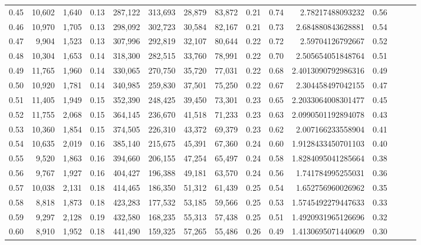 \begin{tabular}{rrrrrrrrrrrrrrr}
0.45 &  10,602 &  1,640 &  0.13 &  287,122 &  313,693 &   28,879 &   83,872 &  0.21 &  0.74 &      2.78217488093232 &      0.56 \\
0.46 &  10,970 &  1,705 &  0.13 &  298,092 &  302,723 &   30,584 &   82,167 &  0.21 &  0.73 &     2.684880843628881 &      0.54 \\
0.47 &   9,904 &  1,523 &  0.13 &  307,996 &  292,819 &   32,107 &   80,644 &  0.22 &  0.72 &      2.59704126792667 &      0.52 \\
0.48 &  10,304 &  1,653 &  0.14 &  318,300 &  282,515 &   33,760 &   78,991 &  0.22 &  0.70 &     2.505654051848764 &      0.51 \\
0.49 &  11,765 &  1,960 &  0.14 &  330,065 &  270,750 &   35,720 &   77,031 &  0.22 &  0.68 &    2.4013090792986316 &      0.49 \\
0.50 &  10,920 &  1,781 &  0.14 &  340,985 &  259,830 &   37,501 &   75,250 &  0.22 &  0.67 &     2.304458497042155 &      0.47 \\
0.51 &  11,405 &  1,949 &  0.15 &  352,390 &  248,425 &   39,450 &   73,301 &  0.23 &  0.65 &    2.2033064008301477 &      0.45 \\
0.52 &  11,755 &  2,068 &  0.15 &  364,145 &  236,670 &   41,518 &   71,233 &  0.23 &  0.63 &    2.0990501192894078 &      0.43 \\
0.53 &  10,360 &  1,854 &  0.15 &  374,505 &  226,310 &   43,372 &   69,379 &  0.23 &  0.62 &     2.007166233558904 &      0.41 \\
0.54 &  10,635 &  2,019 &  0.16 &  385,140 &  215,675 &   45,391 &   67,360 &  0.24 &  0.60 &    1.9128433450701103 &      0.40 \\
0.55 &   9,520 &  1,863 &  0.16 &  394,660 &  206,155 &   47,254 &   65,497 &  0.24 &  0.58 &    1.8284095041285664 &      0.38 \\
0.56 &   9,767 &  1,927 &  0.16 &  404,427 &  196,388 &   49,181 &   63,570 &  0.24 &  0.56 &     1.741784995255031 &      0.36 \\
0.57 &  10,038 &  2,131 &  0.18 &  414,465 &  186,350 &   51,312 &   61,439 &  0.25 &  0.54 &     1.652756960026962 &      0.35 \\
0.58 &   8,818 &  1,873 &  0.18 &  423,283 &  177,532 &   53,185 &   59,566 &  0.25 &  0.53 &    1.5745492279447633 &      0.33 \\
0.59 &   9,297 &  2,128 &  0.19 &  432,580 &  168,235 &   55,313 &   57,438 &  0.25 &  0.51 &    1.4920931965126696 &      0.32 \\
0.60 &   8,910 &  1,952 &  0.18 &  441,490 &  159,325 &   57,265 &   55,486 &  0.26 &  0.49 &    1.4130695071440609 &      0.30 \\

\end{tabular}
